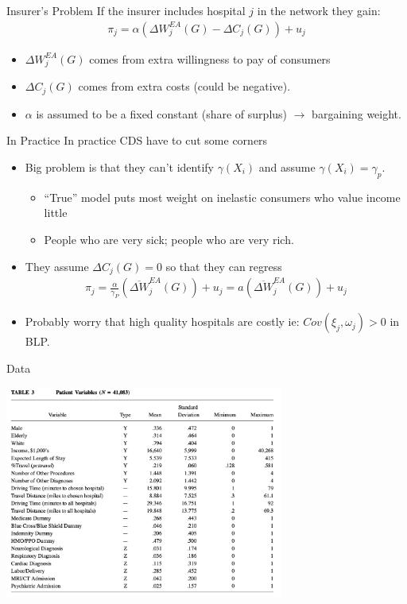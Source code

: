 \documentclass[xcolor=pdftex,dvipsnames,table,mathserif,aspectratio=169]{beamer}
\begin{document}
\begin{frame}{Insurer's Problem}
If the insurer includes hospital $j$ in the network they gain:
\begin{align*}
\pi_{j}=\alpha\left(\Delta W_{j}^{E A}(G)-\Delta C_{j}(G)\right)+u_{j}
\end{align*}
\begin{itemize}
\item $\Delta W_{j}^{E A}(G)$ comes from extra willingness to pay of consumers
\item $\Delta C_{j}(G)$ comes from extra costs (could be negative).
\item $\alpha$ is assumed to be a fixed  constant (share of surplus) $\rightarrow$ \alert{bargaining weight}.
\end{itemize}
\end{frame}

\begin{frame}{In Practice}
In practice CDS have to cut some corners
\begin{itemize}
\item Big problem is that they can't identify $\gamma(X_i)$ and assume $\gamma(X_i) = \gamma_p$.
\begin{itemize}
\item ``True'' model puts most weight on \alert{inelastic} consumers who value income little
\item People who are very sick; people who are very rich.
\end{itemize}
\item They assume $\Delta C_j(G)=0$ so that they can regress
\begin{align*}
\pi_{j}=\frac{\alpha}{\gamma_{P}}\left(\overline{\Delta W}_{j}^{E A}(G)\right)+u_{j}=a\left(\overline{\Delta W}_{j}^{E A}(G)\right)+u_{j}
\end{align*}
\item Probably worry that high quality hospitals are costly ie: $Cov(\xi_j,\omega_j) >0$ in BLP.
\end{itemize}
\end{frame}

\begin{frame}{Data}
\begin{center}
\includegraphics[height=7cm]{./resources/cds_table3.png}
\end{center}
\end{frame}
\end{document}
